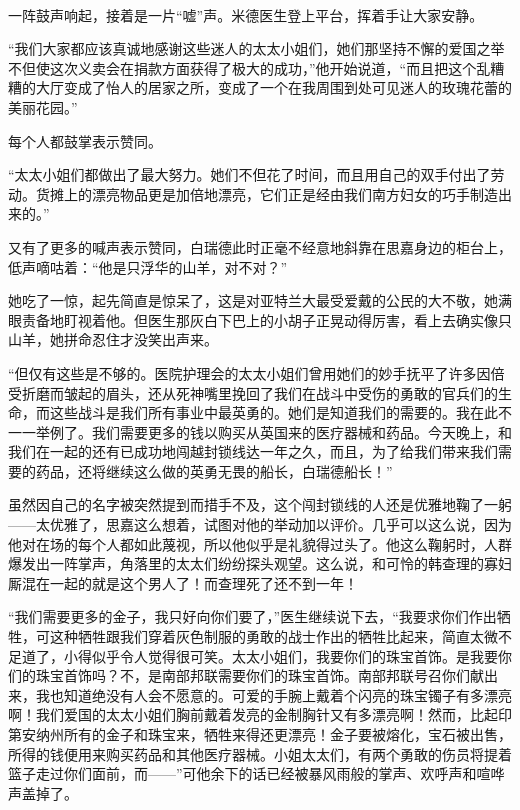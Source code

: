 \par  
\par 一阵鼓声响起，接着是一片“嘘”声。米德医生登上平台，挥着手让大家安静。
\par “我们大家都应该真诚地感谢这些迷人的太太小姐们，她们那坚持不懈的爱国之举不但使这次义卖会在捐款方面获得了极大的成功，”他开始说道，“而且把这个乱糟糟的大厅变成了怡人的居家之所，变成了一个在我周围到处可见迷人的玫瑰花蕾的美丽花园。”
\par 每个人都鼓掌表示赞同。
\par “太太小姐们都做出了最大努力。她们不但花了时间，而且用自己的双手付出了劳动。货摊上的漂亮物品更是加倍地漂亮，它们正是经由我们南方妇女的巧手制造出来的。”
\par 又有了更多的喊声表示赞同，白瑞德此时正毫不经意地斜靠在思嘉身边的柜台上，低声嘀咕着：“他是只浮华的山羊，对不对？”
\par 她吃了一惊，起先简直是惊呆了，这是对亚特兰大最受爱戴的公民的大不敬，她满眼责备地盯视着他。但医生那灰白下巴上的小胡子正晃动得厉害，看上去确实像只山羊，她拼命忍住才没笑出声来。
\par “但仅有这些是不够的。医院护理会的太太小姐们曾用她们的妙手抚平了许多因倍受折磨而皱起的眉头，还从死神嘴里挽回了我们在战斗中受伤的勇敢的官兵们的生命，而这些战斗是我们所有事业中最英勇的。她们是知道我们的需要的。我在此不一一举例了。我们需要更多的钱以购买从英国来的医疗器械和药品。今天晚上，和我们在一起的还有已成功地闯越封锁线达一年之久，而且，为了给我们带来我们需要的药品，还将继续这么做的英勇无畏的船长，白瑞德船长！”
\par 虽然因自己的名字被突然提到而措手不及，这个闯封锁线的人还是优雅地鞠了一躬——太优雅了，思嘉这么想着，试图对他的举动加以评价。几乎可以这么说，因为他对在场的每个人都如此蔑视，所以他似乎是礼貌得过头了。他这么鞠躬时，人群爆发出一阵掌声，角落里的太太们纷纷探头观望。这么说，和可怜的韩查理的寡妇厮混在一起的就是这个男人了！而查理死了还不到一年！
\par “我们需要更多的金子，我只好向你们要了，”医生继续说下去，“我要求你们作出牺牲，可这种牺牲跟我们穿着灰色制服的勇敢的战士作出的牺牲比起来，简直太微不足道了，小得似乎令人觉得很可笑。太太小姐们，我要你们的珠宝首饰。是我要你们的珠宝首饰吗？不，是南部邦联需要你们的珠宝首饰。南部邦联号召你们献出来，我也知道绝没有人会不愿意的。可爱的手腕上戴着个闪亮的珠宝镯子有多漂亮啊！我们爱国的太太小姐们胸前戴着发亮的金制胸针又有多漂亮啊！然而，比起印第安纳州所有的金子和珠宝来，牺牲来得还更漂亮！金子要被熔化，宝石被出售，所得的钱便用来购买药品和其他医疗器械。小姐太太们，有两个勇敢的伤员将提着篮子走过你们面前，而——”可他余下的话已经被暴风雨般的掌声、欢呼声和喧哗声盖掉了。
